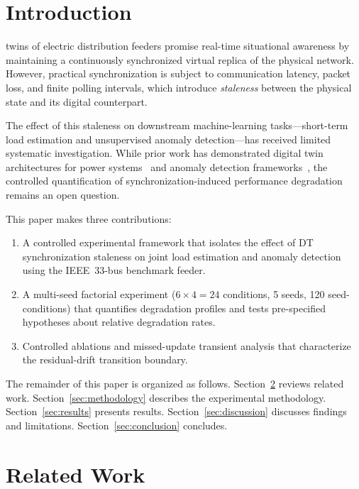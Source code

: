 \documentclass[journal]{IEEEtran}
\begin{document}
\section{Introduction}
\label{sec:introduction}

 twins of electric distribution feeders promise
real-time situational awareness by maintaining a continuously synchronized
virtual replica of the physical network. However, practical synchronization
is subject to communication latency, packet loss, and finite polling
intervals, which introduce \emph{staleness} between the physical state and
its digital counterpart.

The effect of this staleness on downstream machine-learning tasks---short-term
load estimation and unsupervised anomaly detection---has received limited
systematic investigation. While prior work has demonstrated digital twin
architectures for power systems~\cite{ref_dt_survey} and anomaly detection
frameworks~\cite{ref_ad_survey}, the controlled quantification of
synchronization-induced performance degradation remains an open question.

This paper makes three contributions:
\begin{enumerate}
    \item A controlled experimental framework that isolates the effect of
          DT synchronization staleness on joint load estimation and anomaly
          detection using the IEEE~33-bus benchmark feeder.
    \item A multi-seed factorial experiment ($6 \times 4 = 24$ conditions,
          5 seeds, 120 seed-conditions) that quantifies degradation profiles
          and tests pre-specified hypotheses about relative degradation rates.
    \item Controlled ablations and missed-update transient analysis that
          characterize the residual-drift transition boundary.
\end{enumerate}

The remainder of this paper is organized as follows. Section~\ref{sec:related}
reviews related work. Section~\ref{sec:methodology} describes the experimental
methodology. Section~\ref{sec:results} presents results.
Section~\ref{sec:discussion} discusses findings and limitations.
Section~\ref{sec:conclusion} concludes.


\section{Related Work}
\label{sec:related}
\end{document}

